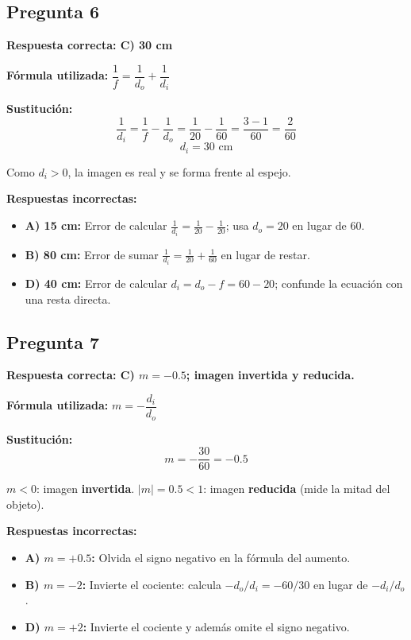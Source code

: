 \begin{respuestabox}
\subsection*{Pregunta 6}
\textcolor{verdecorrecto}{\textbf{Respuesta correcta: C) 30 cm}}

\textbf{Fórmula utilizada:} $\dfrac{1}{f} = \dfrac{1}{d_o} + \dfrac{1}{d_i}$

\textbf{Sustitución:}
$$\frac{1}{d_i} = \frac{1}{f} - \frac{1}{d_o} = \frac{1}{20} - \frac{1}{60} = \frac{3-1}{60} = \frac{2}{60}$$
$$d_i = 30 \text{ cm}$$

Como $d_i > 0$, la imagen es real y se forma frente al espejo.

\textbf{Respuestas incorrectas:}
\begin{itemize}
    \item \textbf{A) 15 cm:} Error de calcular $\frac{1}{d_i} = \frac{1}{20} - \frac{1}{20}$; usa $d_o = 20$ en lugar de 60.
    \item \textbf{B) 80 cm:} Error de sumar $\frac{1}{d_i} = \frac{1}{20} + \frac{1}{60}$ en lugar de restar.
    \item \textbf{D) 40 cm:} Error de calcular $d_i = d_o - f = 60 - 20$; confunde la ecuación con una resta directa.
\end{itemize}
\end{respuestabox}
\newpage
\begin{respuestabox}
\subsection*{Pregunta 7}
\textcolor{verdecorrecto}{\textbf{Respuesta correcta: C) $m = -0.5$; imagen invertida y reducida.}}

\textbf{Fórmula utilizada:} $m = -\dfrac{d_i}{d_o}$

\textbf{Sustitución:}
$$m = -\frac{30}{60} = -0.5$$

$m < 0$: imagen \textbf{invertida}. $|m| = 0.5 < 1$: imagen \textbf{reducida} (mide la mitad del objeto).

\textbf{Respuestas incorrectas:}
\begin{itemize}
    \item \textbf{A) $m = +0.5$:} Olvida el signo negativo en la fórmula del aumento.
    \item \textbf{B) $m = -2$:} Invierte el cociente: calcula $-d_o/d_i = -60/30$ en lugar de $-d_i/d_o$.
    \item \textbf{D) $m = +2$:} Invierte el cociente y además omite el signo negativo.
\end{itemize}
\end{respuestabox}

